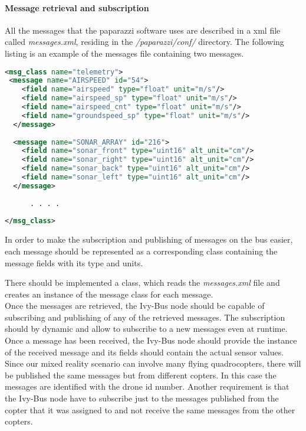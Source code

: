 \paragraph{Message retrieval and subscription}

All the messages that the paparazzi software uses are described in a xml file called \textit{messages.xml}, residing in the \textit{/paparazzi/conf/} directory. The following listing is an example of the messages file containing two messages.

\begin{lstlisting}[basicstyle=\tiny, caption={Message Xml definition}, label={lst:MessageXml}, language = Xml]
<msg_class name="telemetry">
 <message name="AIRSPEED" id="54">
    <field name="airspeed" type="float" unit="m/s"/>
    <field name="airspeed_sp" type="float" unit="m/s"/>
    <field name="airspeed_cnt" type="float" unit="m/s"/>
    <field name="groundspeed_sp" type="float" unit="m/s"/>
  </message>
  
  <message name="SONAR_ARRAY" id="216">
	<field name="sonar_front" type="uint16" alt_unit="cm"/>
	<field name="sonar_right" type="uint16" alt_unit="cm"/>
	<field name="sonar_back" type="uint16" alt_unit="cm"/>
	<field name="sonar_left" type="uint16" alt_unit="cm"/>
  </message>
	
	  . . . . 
	  
</msg_class>
\end{lstlisting}

In order to make the subscription and publishing of messages on the bus easier, each message should be represented as a corresponding class containing the message fields with its type and units.

There should be implemented a class, which reads the \textit{messages.xml} file and creates an instance of the message class for each message. \\
Once the messages are retrieved, the Ivy-Bus node should be capable of subscribing and publishing of any of the retrieved messages. The subscription should by dynamic and allow to subscribe to a new messages even at runtime. \\
Once a message has been received, the Ivy-Bus node should provide the instance of the received message and its fields should contain the actual sensor values.\\
Since our mixed reality scenario can involve many flying quadrocopters, there will be published the same messages but from different copters. In this case the messages are identified with the drone id number.
Another requirement is that the Ivy-Bus node have to subscribe just to the messages published from the copter that it was assigned to and not receive the same messages from the other copters.

